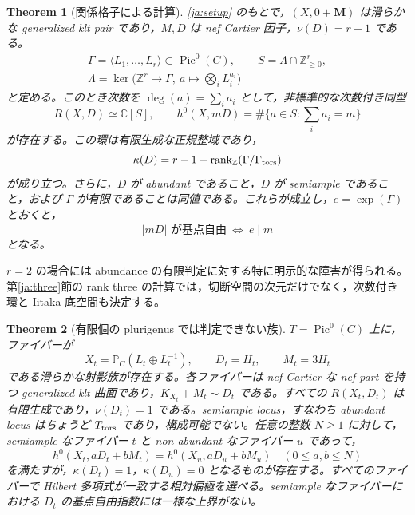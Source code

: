 \documentclass[12pt]{amsart}
\newtheorem{thm}{Theorem}[section]
\theoremstyle{definition}
\theoremstyle{remark}
\numberwithin{equation}{section}
\newcommand{\rank}{\operatorname{rank}}
\newcommand{\Z}{\mathbb{Z}}
\newcommand{\C}{\mathbb{C}}
\newcommand{\mP}{\mathbb{P}}
\DeclareMathOperator{\Pic}{Pic}
\newcommand{\bM}{\mathbf M}
\newcommand{\NN}{\mathbb Z_{\geq0}}
\begin{document}
\begin{thm}[関係格子による計算]\label{ja:main}
\eqref{ja:setup} のもとで，$(X,0+\bM)$ は滑らかな generalized klt pair であり，$M,D$ は nef Cartier 因子，$\nu(D)=r-1$ である。
\[
 \begin{gathered}
 \Gamma=\langle L_1,\ldots,L_r\rangle\subset\Pic^0(C),\qquad S=\Lambda\cap\NN^r,\\
 \Lambda=\ker\bigl(\Z^r\longrightarrow\Gamma,\ a\longmapsto\textstyle\bigotimes_i L_i^{a_i}\bigr)
 \end{gathered}
\]
と定める。このとき次数を $\deg(a)=\sum_i a_i$ として，非標準的な次数付き同型
\begin{equation}\label{ja:ring}
 R(X,D)\simeq\C[S],\qquad
 h^0(X,mD)=\#\{a\in S:\textstyle\sum_i a_i=m\}
\end{equation}
が存在する。この環は有限生成な正規整域であり，
\begin{equation}\label{ja:kappa}
 \kappa(D)=r-1-\rank_{\Z}(\Gamma/\Gamma_{\rm tors})
\end{equation}
が成り立つ。さらに，$D$ が abundant であること，$D$ が semiample であること，および $\Gamma$ が有限であることは同値である。これらが成立し，$e=\exp(\Gamma)$ とおくと，
\begin{equation}\label{ja:bpf}
 |mD|\text{ が基点自由}\ \Longleftrightarrow\ e\mid m
\end{equation}
となる。
\end{thm}

$r=2$ の場合には abundance の有限判定に対する特に明示的な障害が得られる。第\ref{ja:three}節の rank three の計算では，切断空間の次元だけでなく，次数付き環と Iitaka 底空間も決定する。

\begin{thm}[有限個の plurigenus では判定できない族]\label{ja:familyintro}
$T=\Pic^0(C)$ 上に，ファイバーが
\[
 X_t=\mP_C(L_t\oplus L_t^{-1}),\qquad D_t=H_t,\qquad M_t=3H_t
\]
である滑らかな射影族が存在する。各ファイバーは nef Cartier な nef part を持つ generalized klt 曲面であり，$K_{X_t}+M_t\sim D_t$ である。すべての $R(X_t,D_t)$ は有限生成であり，$\nu(D_t)=1$ である。semiample locus，すなわち abundant locus はちょうど $T_{\rm tors}$ であり，構成可能でない。任意の整数 $N\geq1$ に対して，semiample なファイバー $t$ と non-abundant なファイバー $u$ であって，
\[
 h^0(X_t,aD_t+bM_t)=h^0(X_u,aD_u+bM_u)
 \quad(0\leq a,b\leq N)
\]
を満たすが，$\kappa(D_t)=1$，$\kappa(D_u)=0$ となるものが存在する。すべてのファイバーで Hilbert 多項式が一致する相対偏極を選べる。semiample なファイバーにおける $D_t$ の基点自由指数には一様な上界がない。
\end{thm}
\end{document}
